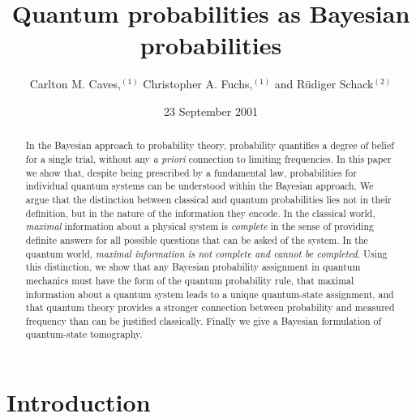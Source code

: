 \documentclass[aps,12pt]{revtex4}
\begin{document}
\title{\bf Quantum probabilities as Bayesian probabilities}

\author{Carlton M. Caves,$^{(1)}$\cite{Permaddress} Christopher A.
Fuchs,$^{(1)}$ and R\"udiger Schack$^{(2)}$\medskip}

\address{$^1$Bell Labs, Lucent Technologies, 600--700
Mountain Avenue, Murray Hill, New Jersey 07974, USA
\\
$^2$Department of Mathematics, Royal Holloway, University of London,
Egham, Surrey TW20$\;$0EX, United Kingdom
\\
\medskip
}

\begin{abstract}
  In the Bayesian approach to probability theory, probability
  quantifies a degree of belief for a single trial, without any {\it
  a priori\/} connection to limiting frequencies.  In this
  paper we show that, despite being
  prescribed by a fundamental law, probabilities for individual
  quantum systems can be understood within the Bayesian approach.  We
  argue that the distinction between classical and quantum
  probabilities lies not in their definition, but in the nature of
  the information they encode. In the classical world, {\it
  maximal\/} information about a physical system is {\it complete\/}
  in the sense of providing definite answers for all possible
  questions that can be asked of the system.  In the quantum world,
  {\it maximal information is not complete and cannot be completed}.
  Using this distinction, we show that any Bayesian probability
  assignment in quantum mechanics must have the form of the quantum
  probability rule, that maximal information about a quantum system
  leads to a unique quantum-state assignment, and that quantum theory
  provides a stronger connection between probability and measured
  frequency than can be justified classically.  Finally we give a
  Bayesian formulation of quantum-state tomography.
\end{abstract}
\date{23 September 2001}

\maketitle

\medskip

\section{Introduction}
\end{document}
